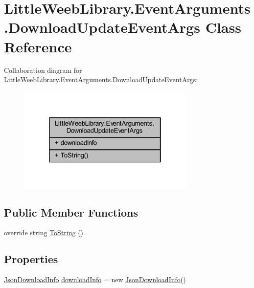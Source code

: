\hypertarget{class_little_weeb_library_1_1_event_arguments_1_1_download_update_event_args}{}\section{Little\+Weeb\+Library.\+Event\+Arguments.\+Download\+Update\+Event\+Args Class Reference}
\label{class_little_weeb_library_1_1_event_arguments_1_1_download_update_event_args}


Collaboration diagram for Little\+Weeb\+Library.\+Event\+Arguments.\+Download\+Update\+Event\+Args\+:\nopagebreak
\begin{figure}[H]
\begin{center}
\leavevmode
\includegraphics[width=250pt]{class_little_weeb_library_1_1_event_arguments_1_1_download_update_event_args__coll__graph}
\end{center}
\end{figure}
\subsection*{Public Member Functions}
\begin{DoxyCompactItemize}
\item 
override string \mbox{\hyperlink{class_little_weeb_library_1_1_event_arguments_1_1_download_update_event_args_ac81037572c354a14f1d35b654ac24b5a}{To\+String}} ()
\end{DoxyCompactItemize}
\subsection*{Properties}
\begin{DoxyCompactItemize}
\item 
\mbox{\hyperlink{class_little_weeb_library_1_1_models_1_1_json_download_info}{Json\+Download\+Info}} \mbox{\hyperlink{class_little_weeb_library_1_1_event_arguments_1_1_download_update_event_args_a6f920facf63fcef57167ccf645ed42bf}{download\+Info}} = new \mbox{\hyperlink{class_little_weeb_library_1_1_models_1_1_json_download_info}{Json\+Download\+Info}}()
\end{DoxyCompactItemize}


